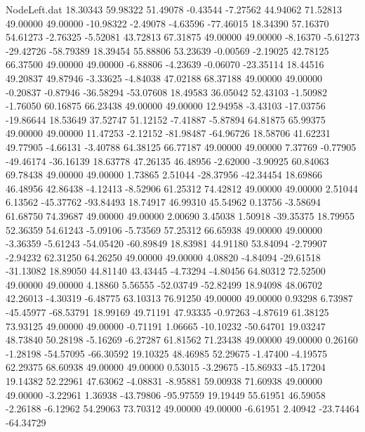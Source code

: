 \begin{filecontents}{NodeLeft.dat}
  18.30343   59.98322   51.49078    -0.43544   -7.27562   44.94062   71.52813   49.00000   49.00000  -10.98322   -2.49078   -4.63596  -77.46015
  18.34390   57.16370   54.61273    -2.76325   -5.52081   43.72813   67.31875   49.00000   49.00000   -8.16370   -5.61273  -29.42726  -58.79389
  18.39454   55.88806   53.23639    -0.00569   -2.19025   42.78125   66.37500   49.00000   49.00000   -6.88806   -4.23639   -0.06070  -23.35114
  18.44516   49.20837   49.87946    -3.33625   -4.84038   47.02188   68.37188   49.00000   49.00000   -0.20837   -0.87946  -36.58294  -53.07608
  18.49583   36.05042   52.43103    -1.50982   -1.76050   60.16875   66.23438   49.00000   49.00000   12.94958   -3.43103  -17.03756  -19.86644
  18.53649   37.52747   51.12152    -7.41887   -5.87894   64.81875   65.99375   49.00000   49.00000   11.47253   -2.12152  -81.98487  -64.96726
  18.58706   41.62231   49.77905    -4.66131   -3.40788   64.38125   66.77187   49.00000   49.00000    7.37769   -0.77905  -49.46174  -36.16139
  18.63778   47.26135   46.48956    -2.62000   -3.90925   60.84063   69.78438   49.00000   49.00000    1.73865    2.51044  -28.37956  -42.34454
  18.69866   46.48956   42.86438    -4.12413   -8.52906   61.25312   74.42812   49.00000   49.00000    2.51044    6.13562  -45.37762  -93.84493
  18.74917   46.99310   45.54962     0.13756   -3.58694   61.68750   74.39687   49.00000   49.00000    2.00690    3.45038    1.50918  -39.35375
  18.79955   52.36359   54.61243    -5.09106   -5.73569   57.25312   66.65938   49.00000   49.00000   -3.36359   -5.61243  -54.05420  -60.89849
  18.83981   44.91180   53.84094    -2.79907   -2.94232   62.31250   64.26250   49.00000   49.00000    4.08820   -4.84094  -29.61518  -31.13082
  18.89050   44.81140   43.43445    -4.73294   -4.80456   64.80312   72.52500   49.00000   49.00000    4.18860    5.56555  -52.03749  -52.82499
  18.94098   48.06702   42.26013    -4.30319   -6.48775   63.10313   76.91250   49.00000   49.00000    0.93298    6.73987  -45.45977  -68.53791
  18.99169   49.71191   47.93335    -0.97263   -4.87619   61.38125   73.93125   49.00000   49.00000   -0.71191    1.06665  -10.10232  -50.64701
  19.03247   48.73840   50.28198    -5.16269   -6.27287   61.81562   71.23438   49.00000   49.00000    0.26160   -1.28198  -54.57095  -66.30592
  19.10325   48.46985   52.29675    -1.47400   -4.19575   62.29375   68.60938   49.00000   49.00000    0.53015   -3.29675  -15.86933  -45.17204
  19.14382   52.22961   47.63062    -4.08831   -8.95881   59.00938   71.60938   49.00000   49.00000   -3.22961    1.36938  -43.79806  -95.97559
  19.19449   55.61951   46.59058    -2.26188   -6.12962   54.29063   73.70312   49.00000   49.00000   -6.61951    2.40942  -23.74464  -64.34729

\end{filecontents}
